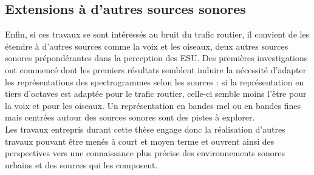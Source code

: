 \subsection*{Extensions à d'autres sources sonores}
Enfin, si ces travaux se sont intéressés au bruit du trafic routier, il convient de les étendre à d'autres sources comme la voix et les oiseaux, deux autres sources sonores prépondérantes dans la perception des ESU. Des premières investigations ont commencé dont les premiers résultats semblent induire la nécessité d'adapter les représentations des spectrogrammes selon les sources : si la représentation en tiers d'octaves est adaptée pour le trafic routier, celle-ci semble moins l'être pour la voix et pour les oiseaux. Un représentation en bandes mel ou en bandes fines mais centrées autour des sources sonores sont des pistes à explorer. \\

Les travaux entrepris durant cette thèse engage donc la réalisation d'autres travaux pouvant être menés à court et moyen terme et ouvrent ainsi des perspectives vers une connaissance plus précise des environnements sonores urbains et des sources qui les composent.






